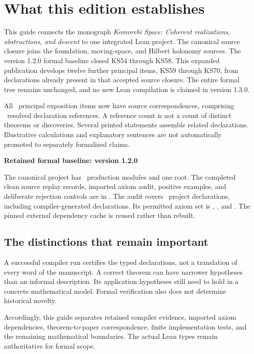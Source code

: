 \documentclass[11pt]{article}
\begin{document}
\KomorebiCover
\section*{What this edition establishes}
This guide connects the monograph \emph{Komorebi Space: Coherent realizations, obstructions, and descent} to one integrated Lean project. The canonical source closure joins the foundation, moving-space, and Hilbert holonomy sources. The version 1.2.0 formal baseline closed KS54 through KS58. This expanded publication develops twelve further principal items, KS59 through KS70, from declarations already present in that accepted source closure. The entire formal tree remains unchanged, and no new Lean compilation is claimed in version 1.3.0.

All \EditionClaims\ principal exposition items now have source correspondences, comprising \EditionReferences\ resolved declaration references. A reference count is not a count of distinct theorems or discoveries. Several printed statements assemble related declarations. Illustrative calculations and explanatory sentences are not automatically promoted to separately formalized claims.

\begin{scopebox}
\textbf{Retained formal baseline: version 1.2.0}\par
The canonical project has \EditionFormalModules\ production modules and one root. The completed clean source replay records, imported axiom audit, positive examples, and deliberate rejection controls are in . The audit covers \EditionAuditedDeclarations\ project declarations, including compiler-generated declarations. Its permitted axiom set is , , and . The pinned external dependency cache is reused rather than rebuilt.
\end{scopebox}

\subsection*{The distinctions that remain important}
A successful compiler run certifies the typed declarations, not a translation of every word of the manuscript. A correct theorem can have narrower hypotheses than an informal description. Its application hypotheses still need to hold in a concrete mathematical model. Formal verification also does not determine historical novelty.

Accordingly, this guide separates retained compiler evidence, imported axiom dependencies, theorem-to-paper correspondence, finite implementation tests, and the remaining mathematical boundaries. The actual Lean types remain authoritative for formal scope.
\end{document}
